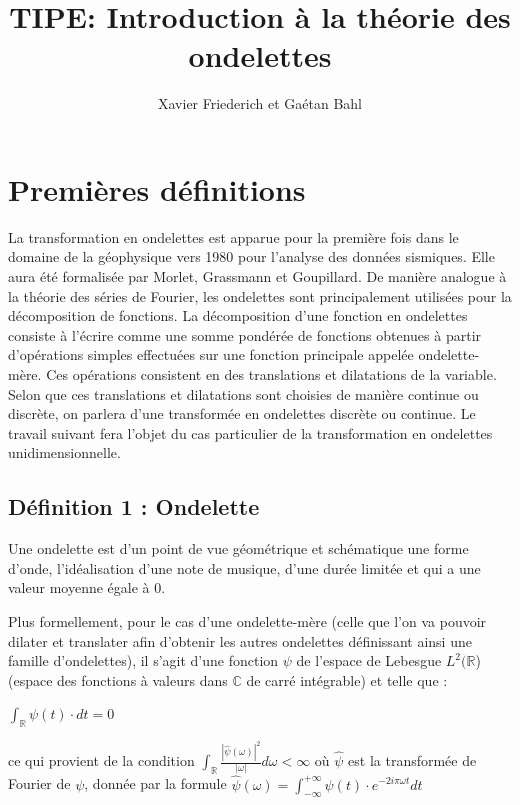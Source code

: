\documentclass{article}
\title{TIPE: Introduction à la théorie des ondelettes}
\author{Xavier Friederich et Gaétan Bahl}
\begin{document}
\maketitle
\tableofcontents
\listoffigures
{}
\clearpage

\newcommand{\fonction}[5]{\begin{array}{l|rcl}
#1: & #2 & \longrightarrow & #3 \\
    & #4 & \longmapsto & #5 \end{array}}




\section{Premières définitions}


La transformation en ondelettes est apparue pour la première fois dans le domaine de la géophysique vers 1980 pour l’analyse des données sismiques. Elle aura été formalisée par Morlet, Grassmann et Goupillard.
De manière analogue à la théorie des séries de Fourier, les ondelettes sont principalement utilisées pour la décomposition de fonctions. La décomposition d’une fonction en ondelettes consiste à l’écrire comme une somme pondérée de fonctions obtenues à partir d’opérations simples effectuées sur une fonction principale appelée ondelette-mère. Ces opérations consistent en des translations et dilatations de la variable. Selon que ces translations et dilatations sont choisies de manière continue ou discrète, on parlera d’une transformée en ondelettes discrète ou continue.
Le travail suivant fera l’objet du cas particulier de la transformation en ondelettes unidimensionnelle.


\subsection{Définition 1 : Ondelette}

Une ondelette est d’un point de vue géométrique et schématique une forme d’onde, l’idéalisation d’une note de musique, d’une durée limitée et qui a une valeur moyenne égale à 0. 

Plus formellement, pour le cas d’une ondelette-mère (celle que l’on va pouvoir dilater et translater afin d’obtenir les autres ondelettes définissant ainsi une famille d’ondelettes), il s’agit d’une fonction $\psi$ de l'espace de Lebesgue $L^2(\mathbb{R}$) (espace des fonctions à valeurs dans $\mathbb{C}$ de carré intégrable) et telle que :
\begin{center}
$\displaystyle \int_{\mathbb{R}}\psi{}(t)\cdot{}dt = 0$
\end{center}
ce qui provient de la condition $\int_{\mathbb{R}} \frac{|\hat{\psi}(\omega)|^2}{|\omega|}d\omega < \infty$ où $\hat{\psi}$ est la transformée de Fourier de $\psi$, donnée par la formule $\displaystyle \hat{\psi}(\omega)= \int_{-\infty}^{+\infty}\psi{}(t)\cdot{}e^{-2i\pi\omega{}t}dt$
\end{document}
